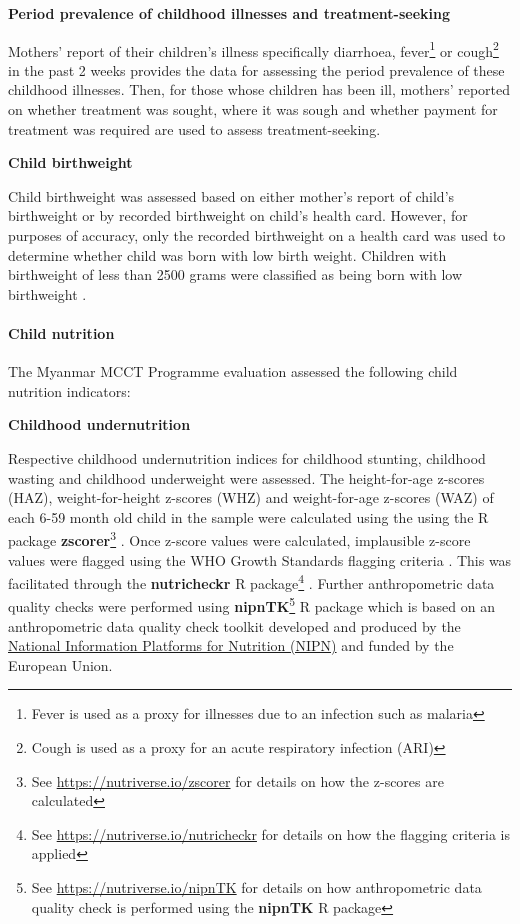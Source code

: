 \documentclass[12pt,a4paper]{article}
\let\oldparagraph\paragraph
\renewcommand{\paragraph}[1]{\oldparagraph{#1}\mbox{}}
\let\rmarkdownfootnote\footnote%
\def\footnote{\protect\rmarkdownfootnote}
\begin{document}
\textbf{Period prevalence of childhood illnesses and treatment-seeking}

Mothers' report of their children's illness specifically diarrhoea, fever\footnote{Fever is used as a proxy for illnesses due to an infection such as malaria} or cough\footnote{Cough is used as a proxy for an acute respiratory infection (ARI)} in the past 2 weeks provides the data for assessing the period prevalence of these childhood illnesses. Then, for those whose children has been ill, mothers' reported on whether treatment was sought, where it was sough and whether payment for treatment was required are used to assess treatment-seeking.

\textbf{Child birthweight}

Child birthweight was assessed based on either mother's report of child's birthweight or by recorded birthweight on child's health card. However, for purposes of accuracy, only the recorded birthweight on a health card was used to determine whether child was born with low birth weight. Children with birthweight of less than 2500 grams were classified as being born with low birthweight \citep{Woertman:1993hp, Kelly:1997wa}.

\hypertarget{cnut}{%
\paragraph{Child nutrition}\label{cnut}}

The Myanmar MCCT Programme evaluation assessed the following child nutrition indicators:

\textbf{Childhood undernutrition}

Respective childhood undernutrition indices for childhood stunting, childhood wasting and childhood underweight were assessed. The height-for-age z-scores (HAZ), weight-for-height z-scores (WHZ) and weight-for-age z-scores (WAZ) of each 6-59 month old child in the sample were calculated using the using the R package \textbf{zscorer}\footnote{See \url{https://nutriverse.io/zscorer} for details on how the z-scores are calculated} \citep{zscorer2019}. Once z-score values were calculated, implausible z-score values were flagged using the WHO Growth Standards flagging criteria \citep{WorldHealthOrganizationWHO2006}. This was facilitated through the \textbf{nutricheckr} R package\footnote{See \url{https://nutriverse.io/nutricheckr} for details on how the flagging criteria is applied} \citep{nutricheckr2019}. Further anthropometric data quality checks were performed using \textbf{nipnTK}\footnote{See \url{https://nutriverse.io/nipnTK} for details on how anthropometric data quality check is performed using the \textbf{nipnTK} R package} \citep{nipnTK2019} R package which is based on an anthropometric data quality check toolkit developed and produced by the \href{http://www.nipn-nutrition-platforms.org}{National Information Platforms for Nutrition (NIPN)} and funded by the European Union.
\end{document}
